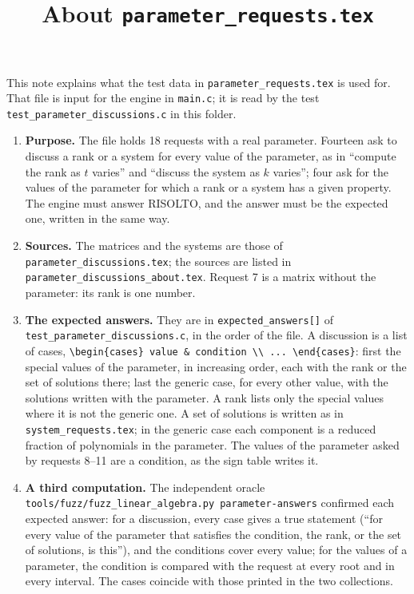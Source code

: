 \documentclass[11pt,a4paper]{article}
\title{About \texttt{parameter\_requests.tex}}
\author{}
\date{}
\begin{document}
\maketitle
This note explains what the test data in \texttt{parameter\_requests.tex} is used for. That file is input for the engine in \texttt{main.c}; it is read by the test \texttt{test\_parameter\_discussions.c} in this folder.

\begin{enumerate}
\item \textbf{Purpose.} The file holds 18 requests with a real parameter. Fourteen ask to discuss a rank or a system for every value of the parameter, as in ``compute the rank as $t$ varies'' and ``discuss the system as $k$ varies''; four ask for the values of the parameter for which a rank or a system has a given property. The engine must answer RISOLTO, and the answer must be the expected one, written in the same way.

\item \textbf{Sources.} The matrices and the systems are those of \texttt{parameter\_discussions.tex}; the sources are listed in \texttt{parameter\_discussions\_about.tex}. Request 7 is a matrix without the parameter: its rank is one number.

\item \textbf{The expected answers.} They are in \texttt{expected\_answers[]} of \texttt{test\_parameter\_discussions.c}, in the order of the file. A discussion is a list of cases, \texttt{\textbackslash begin\{cases\} value \& condition \textbackslash\textbackslash{} ... \textbackslash end\{cases\}}: first the special values of the parameter, in increasing order, each with the rank or the set of solutions there; last the generic case, for every other value, with the solutions written with the parameter. A rank lists only the special values where it is not the generic one. A set of solutions is written as in \texttt{system\_requests.tex}; in the generic case each component is a reduced fraction of polynomials in the parameter. The values of the parameter asked by requests 8--11 are a condition, as the sign table writes it.

\item \textbf{A third computation.} The independent oracle \texttt{tools/fuzz/fuzz\_linear\_algebra.py parameter-answers} confirmed each expected answer: for a discussion, every case gives a true statement (``for every value of the parameter that satisfies the condition, the rank, or the set of solutions, is this''), and the conditions cover every value; for the values of a parameter, the condition is compared with the request at every root and in every interval. The cases coincide with those printed in the two collections.


\end{enumerate}
\end{document}
